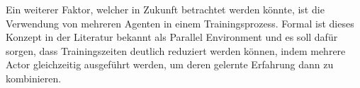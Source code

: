 \documentclass[]{iat}
\begin{document}
Ein weiterer Faktor, welcher in Zukunft betrachtet werden könnte, ist die Verwendung von mehreren Agenten in einem Trainingsprozess. Formal ist dieses Konzept in der Literatur bekannt als Parallel Environment \cite[]{DBLP:journals/corr/ClementeMC17} und es soll dafür sorgen, dass Trainingszeiten deutlich reduziert werden können, indem mehrere Actor gleichzeitig ausgeführt werden, um deren gelernte Erfahrung dann zu kombinieren.


\printbibliography


\end{document}
